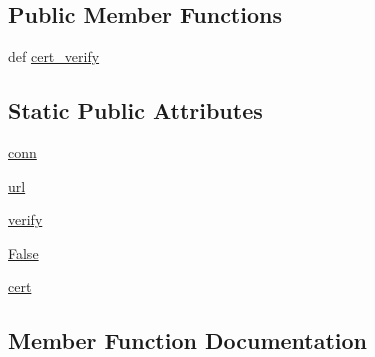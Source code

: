 \subsection*{Public Member Functions}
\begin{DoxyCompactItemize}
\item 
def \hyperlink{classpip_1_1__internal_1_1network_1_1session_1_1InsecureCacheControlAdapter_a32f7a7e6bbcf9c734e7ce0b57f7fb1c7}{cert\+\_\+verify}
\end{DoxyCompactItemize}
\subsection*{Static Public Attributes}
\begin{DoxyCompactItemize}
\item 
\hyperlink{classpip_1_1__internal_1_1network_1_1session_1_1InsecureCacheControlAdapter_aa1b59faadb6062f87c8495b2cafd57ea}{conn}
\item 
\hyperlink{classpip_1_1__internal_1_1network_1_1session_1_1InsecureCacheControlAdapter_a1f4c25e5297c8419f7f178bb83b6a6cd}{url}
\item 
\hyperlink{classpip_1_1__internal_1_1network_1_1session_1_1InsecureCacheControlAdapter_ac9e58b708073eca3bf53b35f7e00f465}{verify}
\item 
\hyperlink{classpip_1_1__internal_1_1network_1_1session_1_1InsecureCacheControlAdapter_a99ca2dca3187b1354698371dd5140c54}{False}
\item 
\hyperlink{classpip_1_1__internal_1_1network_1_1session_1_1InsecureCacheControlAdapter_ac3002d14c8e3a807f41693cb937e6731}{cert}
\end{DoxyCompactItemize}


\subsection{Member Function Documentation}
\mbox{\label{classpip_1_1__internal_1_1network_1_1session_1_1InsecureCacheControlAdapter_a32f7a7e6bbcf9c734e7ce0b57f7fb1c7}} 
